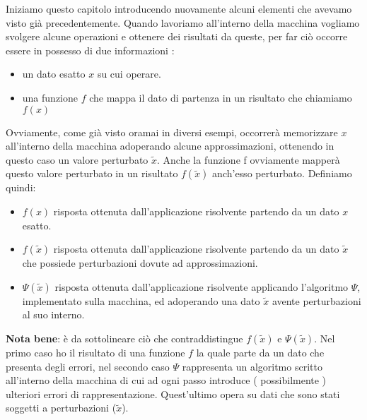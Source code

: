 \documentclass[12pt, a4paper]{book}
\theoremstyle{definition}
\begin{document}
\begin{flushleft}

Iniziamo questo capitolo introducendo nuovamente alcuni elementi che avevamo visto già precedentemente.  Quando lavoriamo all'interno della macchina vogliamo svolgere alcune operazioni e ottenere dei risultati da queste, per far ciò occorre essere in possesso di due informazioni : 
\begin{itemize}
	\item un dato esatto $x$ su cui operare.
	\item una funzione $f$ che mappa il dato di partenza in un risultato che chiamiamo $f(x)$
\end{itemize}
Ovviamente, come già visto oramai in diversi esempi,  occorrerà memorizzare $x$ all'interno della macchina adoperando alcune approssimazioni, ottenendo in questo caso un valore perturbato $\tilde{x}$. Anche la funzione f ovviamente mapperà questo valore perturbato in un risultato $f(\tilde{x})$ anch'esso perturbato. 
\vspace{1em}
Definiamo quindi: 
\begin{itemize}
	\item $f(x)$ risposta ottenuta dall'applicazione risolvente partendo da un dato $x$ esatto.
	\item $f(\tilde{x})$ risposta ottenuta dall'applicazione risolvente partendo da un dato $\tilde{x}$ che possiede perturbazioni dovute ad approssimazioni.
	\item $\Psi(\tilde{x})$ risposta ottenuta dall'applicazione risolvente applicando l'algoritmo $\Psi$, implementato sulla macchina, ed adoperando una dato  $\tilde{x}$ avente perturbazioni al suo interno. 
\end{itemize}

\textbf{Nota bene}: è da sottolineare ciò che contraddistingue $f(\tilde{x})$ e  $\Psi(\tilde{x})$. Nel primo caso ho il risultato di una funzione $f$ la quale parte da un dato che presenta degli errori, nel secondo caso $\Psi$ rappresenta un algoritmo scritto all'interno della macchina di cui ad ogni passo introduce ( possibilmente ) ulteriori errori di rappresentazione. Quest'ultimo opera su dati che sono stati soggetti a perturbazioni ($\tilde{x}$).
\end{flushleft}
\end{document}
